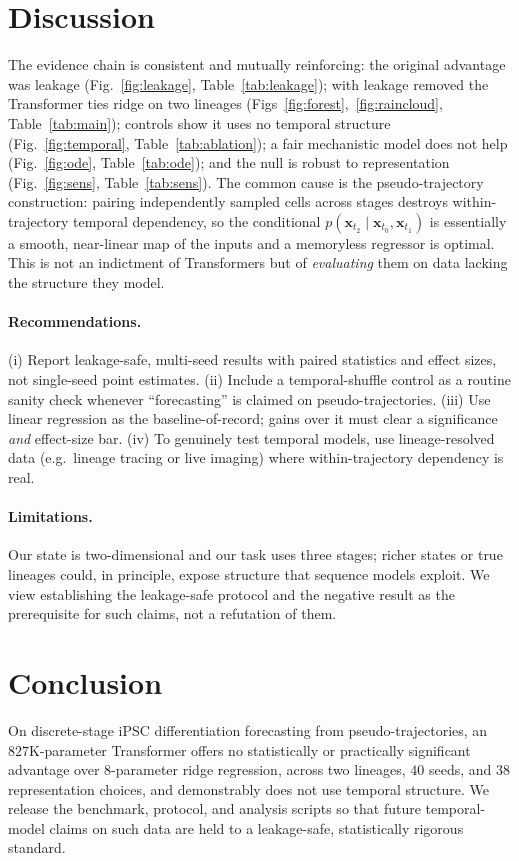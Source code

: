 \documentclass[11pt]{article}
\begin{document}
\section{Discussion}
The evidence chain is consistent and mutually reinforcing: the original advantage
was leakage (Fig.~\ref{fig:leakage}, Table~\ref{tab:leakage}); with leakage removed
the Transformer ties ridge on two lineages (Figs~\ref{fig:forest},~\ref{fig:raincloud},
Table~\ref{tab:main}); controls show it uses no temporal structure
(Fig.~\ref{fig:temporal}, Table~\ref{tab:ablation}); a fair mechanistic model does
not help (Fig.~\ref{fig:ode}, Table~\ref{tab:ode}); and the null is robust to
representation (Fig.~\ref{fig:sens}, Table~\ref{tab:sens}). The common cause is the pseudo-trajectory construction:
pairing independently sampled cells across stages destroys within-trajectory
temporal dependency, so the conditional $p(\mathbf{x}_{t_2}\mid
\mathbf{x}_{t_0},\mathbf{x}_{t_1})$ is essentially a smooth, near-linear map of the
inputs and a memoryless regressor is optimal. This is not an indictment of
Transformers but of \emph{evaluating} them on data lacking the structure they model.

\paragraph{Recommendations.}
(i) Report leakage-safe, multi-seed results with paired statistics and effect
sizes, not single-seed point estimates. (ii) Include a temporal-shuffle control as a
routine sanity check whenever ``forecasting'' is claimed on pseudo-trajectories.
(iii) Use linear regression as the baseline-of-record; gains over it must clear a
significance \emph{and} effect-size bar. (iv) To genuinely test temporal models,
use lineage-resolved data (e.g.\ lineage tracing or live imaging) where
within-trajectory dependency is real.

\paragraph{Limitations.}
Our state is two-dimensional and our task uses three stages; richer states or true
lineages could, in principle, expose structure that sequence models exploit. We
view establishing the leakage-safe protocol and the negative result as the
prerequisite for such claims, not a refutation of them.

\section{Conclusion}
On discrete-stage iPSC differentiation forecasting from pseudo-trajectories, an
$827$K-parameter Transformer offers no statistically or practically significant
advantage over $8$-parameter ridge regression, across two lineages, $40$ seeds, and
$38$ representation choices, and demonstrably does not use temporal structure. We
release the benchmark, protocol, and analysis scripts so that future temporal-model
claims on such data are held to a leakage-safe, statistically rigorous standard.
\end{document}
